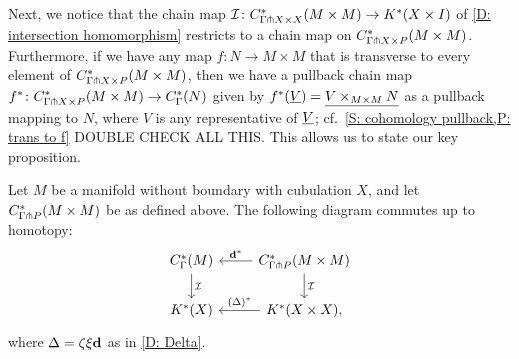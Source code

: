 \documentclass{amsart}
\begin{document}
Next, we notice that the chain map $\mathcal{I} \colon C^*_{\Gamma \pitchfork X\times X}(M\times M) \to K^*(X \times I)$ of \cref{D: intersection homomorphism} restricts to a chain map on $C^*_{\Gamma \pitchfork X\times P}(M\times M)$.
Furthermore, if we have any map $f \colon N \to M \times M$ that is transverse to every element of $C^*_{\Gamma \pitchfork X\times P}(M\times M)$, then we have a pullback chain map $f^* \colon C^*_{\Gamma \pitchfork X\times P}(M\times M) \to C^*_\Gamma(N)$ given by $f^*(\underline{V}) = \underline{V \times_{M \times M} N}$ as a pullback mapping to $N$, where $V$ is any representative of $\underline{V}$; cf.\ \cref{S: cohomology pullback,P: trans to f} DOUBLE CHECK ALL THIS.
This allows us to state our key proposition.

\begin{proposition}
	Let $M$ be a manifold without boundary with cubulation $X$, and let $C^*_{\Gamma \pitchfork P}(M \times M)$ be as defined above.
	The following diagram commutes up to homotopy:
	\[
	\begin{tikzcd}
	C^*_\Gamma(M) \arrow[d,"\mc I"] & C^*_{\Gamma \pf P}(M \times M) \arrow[l,"\diag^*"'] \arrow[d,"\mc I"] \\
	K^*(X) & \arrow[l,"(\Delta)^*"'] K^*(X\times X),
	\end{tikzcd}
	\]
	where $\Delta = \zeta \xi \mathbf{d}$ as in \cref{D: Delta}.
\end{proposition}
\end{document}
